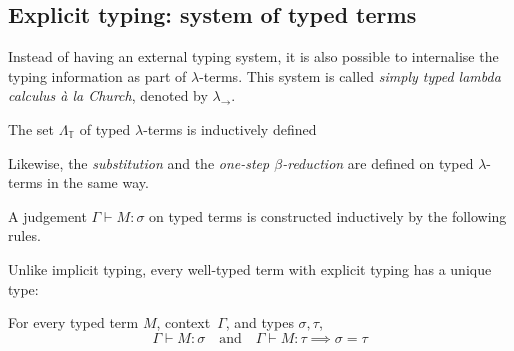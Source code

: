 \subsection{Explicit typing: system of typed terms}
Instead of having an external typing system, it is also possible to internalise
the typing information as part of $\lambda$-terms. This system is called
\emph{simply typed lambda calculus \textit{\`a la} Church}, denoted by
$\lambda_\to$.
\begin{definition}
  The set $\Lambda_\mathbb{T}$ of typed $\lambda$-terms is inductively defined
  \begin{multicols}{2}
    \begin{prooftree}
    \end{prooftree}
    \begin{prooftree}
    \end{prooftree}
    \begin{prooftree}
    \end{prooftree}
  \end{multicols}
\end{definition}
Likewise, the \emph{substitution} and the \emph{one-step $\beta$-reduction} are
defined on typed $\lambda$-terms in the same way. 
\begin{definition}
  A judgement $\Gamma \vdash M : \sigma$ on typed terms is constructed
  inductively by the following rules.
  \begin{multicols}{2} 
  \begin{prooftree}
  \end{prooftree}
  \begin{prooftree}
  \end{prooftree}
  \begin{prooftree}
  \end{prooftree}
  \end{multicols}
\end{definition}
Unlike implicit typing, every well-typed term with explicit typing has 
a unique type:
\begin{proposition}
  For every typed term $M$, context~$\Gamma$, and types $\sigma, \tau$, 
  \[
    \Gamma \vdash M : \sigma
    \quad\text{and}\quad
    \Gamma \vdash M : \tau
    \implies
    \sigma = \tau
  \]
\end{proposition}

